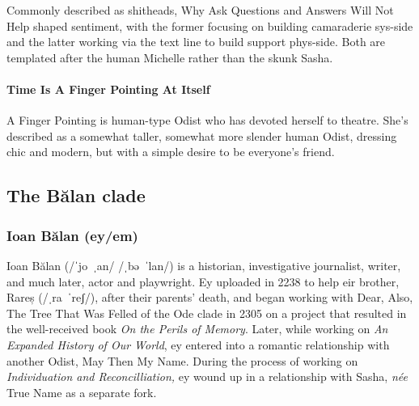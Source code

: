 Commonly described as shitheads, Why Ask Questions and Answers Will Not Help shaped sentiment, with the former focusing on building camaraderie sys-side and the latter working via the text line to build support phys-side. Both are templated after the human Michelle rather than the skunk Sasha.

\begin{comment}
\emph{Appears in:}

\begin{itemize}
\tightlist
\item
  \href{https://toledot.post-self.ink}{\emph{Toledot}}
\item
  \href{https://neviim.post-self.ink}{\emph{Nevi'im}}
\item
  \href{https://mitzvot.post-self.ink}{\emph{Mitzvot}}
\end{itemize}
\end{comment}

\paragraph{Time Is A Finger Pointing At Itself}

A Finger Pointing is human-type Odist who has devoted herself to theatre. She's described as a somewhat taller, somewhat more slender human Odist, dressing chic and modern, but with a simple desire to be everyone's friend.

\begin{comment}
\emph{Appears in:}

\begin{itemize}
\tightlist
\item
  \href{https://toledot.post-self.ink}{\emph{Toledot}} (mentioned)
\item
  \href{https://neviim.post-self.ink}{\emph{Nevi'im}}
\item
  \href{https://mitzvot.post-self.ink}{\emph{Mitzvot}}
\end{itemize}
\end{comment}

\subsection{The Bălan clade}

\subsubsection{Ioan Bălan (ey/em)}

Ioan Bălan (/ˈjo~ˌan/ /ˌbə~ˈlan/) is a historian, investigative journalist, writer, and much later, actor and playwright. Ey uploaded in 2238 to help eir brother, Rareș (/ˌra~ˈreʃ/), after their parents' death, and began working with Dear, Also, The Tree That Was Felled of the Ode clade in 2305 on a project that resulted in the well-received book \emph{On the Perils of Memory}. Later, while working on \emph{An Expanded History of Our World}, ey entered into a romantic relationship with another Odist, May Then My Name. During the process of working on \emph{Individuation and Reconcilliation,} ey wound up in a relationship with Sasha, \emph{née} True Name as a separate fork.

